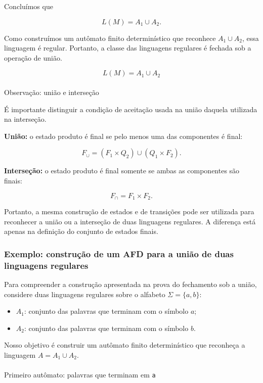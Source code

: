 \documentclass[
  brazilian,
  letterpaper,
]{book}
\makeatletter
\let\oldparagraph\paragraph
\renewcommand{\paragraph}{
    \@ifstar
      \xxxParagraphStar
      \xxxParagraphNoStar
  }
\newcommand{\xxxParagraphStar}[1]{\oldparagraph*{#1}\mbox{}}
\newcommand{\xxxParagraphNoStar}[1]{\oldparagraph{#1}\mbox{}}
\providecommand{\tightlist}{%
  \setlength{\itemsep}{0pt}\setlength{\parskip}{0pt}}
\theoremstyle{plain}
\theoremstyle{definition}
\theoremstyle{remark}
\makeatother
\begin{document}
Concluímos que

\[
L(M) = A_1 \cup A_2.
\]

Como construímos um autômato finito determinístico que reconhece
\(A_1 \cup A_2\), essa linguagem é regular. Portanto, a classe das
linguagens regulares é fechada sob a operação de união.

\[
\boxed{L(M) = A_1 \cup A_2}
\]

\paragraph{Observação: união e
interseção}\label{observauxe7uxe3o-uniuxe3o-e-interseuxe7uxe3o}

É importante distinguir a condição de aceitação usada na união daquela
utilizada na interseção.

\textbf{União:} o estado produto é final se pelo menos uma das
componentes é final:

\[
F_{\cup} = (F_1 \times Q_2) \cup (Q_1 \times F_2).
\]

\textbf{Interseção:} o estado produto é final somente se ambas as
componentes são finais:

\[
F_{\cap} = F_1 \times F_2.
\]

Portanto, a mesma construção de estados e de transições pode ser
utilizada para reconhecer a união ou a interseção de duas linguagens
regulares. A diferença está apenas na definição do conjunto de estados
finais.

\subsubsection{Exemplo: construção de um AFD para a união de duas
linguagens regulares}\label{sec-exemplo-uniao-afd}

Para compreender a construção apresentada na prova do fechamento sob a
união, considere duas linguagens regulares sobre o alfabeto
\(\Sigma=\{a,b\}\):

\begin{itemize}
\tightlist
\item
  \(A_1\): conjunto das palavras que terminam com o símbolo \(a\);
\item
  \(A_2\): conjunto das palavras que terminam com o símbolo \(b\).
\end{itemize}

Nosso objetivo é construir um autômato finito determinístico que
reconheça a linguagem \(A=A_1\cup A_2\).

\paragraph{\texorpdfstring{Primeiro autômato: palavras que terminam em
\texttt{a}}{Primeiro autômato: palavras que terminam em a}}\label{primeiro-autuxf4mato-palavras-que-terminam-em-a}
\end{document}
